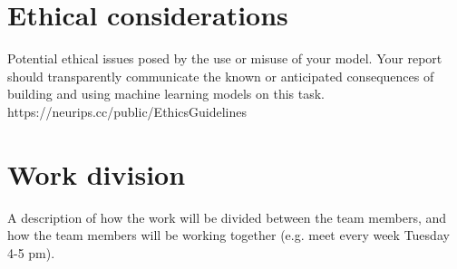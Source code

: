 \documentclass{article}
\begin{document}

\section{Ethical considerations}

Potential ethical issues posed by the use or misuse of
your model. Your report should transparently
communicate the known or anticipated consequences
of building and using machine learning models on this
task.
https://neurips.cc/public/EthicsGuidelines


\section{Work division}

A description of how the work will be divided between
the team members, and how the team members will be
working together (e.g. meet every week Tuesday 4-5
pm).


\end{document}
